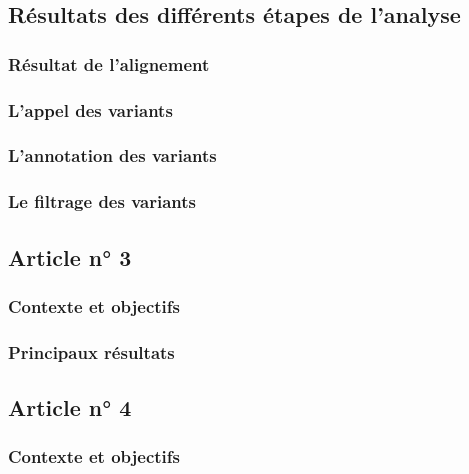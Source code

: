 \documentclass[12pt,twoside]{ugathesis}
\begin{document}
\subsection{Résultats des différents étapes de
l'analyse}\label{resultats-des-differents-etapes-de-lanalyse}

\subsubsection{Résultat de l'alignement}\label{resultat-de-lalignement}

\subsubsection{L'appel des variants}\label{lappel-des-variants-1}

\subsubsection{L'annotation des
variants}\label{lannotation-des-variants-1}

\subsubsection{Le filtrage des
variants}\label{le-filtrage-des-variants-2}

\subsection{Article n° 3}\label{article-n-3}

\subsubsection{Contexte et objectifs}\label{contexte-et-objectifs}

\subsubsection{Principaux résultats}\label{principaux-resultats}

\subsection{Article n° 4}\label{article-n-4}

\subsubsection{Contexte et objectifs}\label{contexte-et-objectifs-1}
\end{document}
